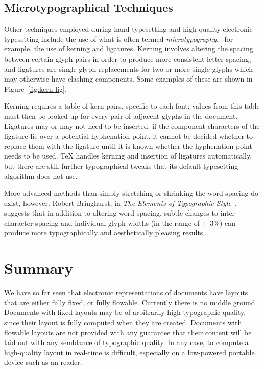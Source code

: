 \subsection{Microtypographical Techniques}
Other techniques employed during hand-type\-set\-t\-ing and high-qua\-l\-ity electronic typesetting include the use of what is often termed \emph{micro\-typo\-graphy},~\cite{Hurst2009} for example, the use of kerning and ligatures. Kerning involves altering the spacing between certain glyph pairs in order to produce more consistent letter spacing, and ligatures are sin\-gle-glyph replacements for two or more single glyphs which may otherwise have clashing components. Some examples of these are shown in Figure~\ref{fig:kern-lig}.

Kerning requires a table of kern-pairs, specific to each font; values from this table must then be looked up for every pair of adjacent glyphs in the document. Ligatures may or may not need to be inserted: if the component characters of the ligature lie over a potential hyphenation point, it cannot be decided whether to replace them with the ligature until it is known whether the hyphenation point needs to be used. \TeX{} handles kerning and insertion of ligatures automatically, but there are still further typographical tweaks that its default typesetting algorithm does not use.

More advanced methods than simply stretching or shrinking the word spacing do exist, however. Robert Bringhurst, in \emph{The Elements of Typographic Style}~\cite{Bringhurst2008}, suggests that in addition to altering word spacing, subtle changes to inter-character spacing and individual glyph widths (in the range of $\pm$ 3\%) can produce more typographically and aesthetically pleasing results.



\section{Summary}

We have so far seen that electronic representations of documents have layouts that are either fully fixed, or fully flowable. Currently there is no middle ground. Documents with fixed layouts may be of arbitrarily high typographic quality, since their layout is fully computed when they are created. Documents with flowable layouts are not provided with any guarantee that their content will be laid out with any semblance of typographic quality. In any case, to compute a high-quality layout in real-time is difficult, especially on a low-powered portable device such as an \ebook{} reader.

